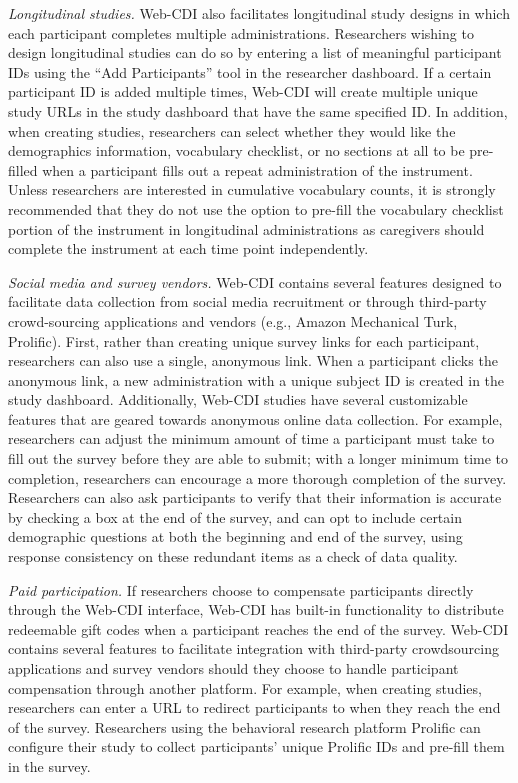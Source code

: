 \documentclass[
  english,
  ,man,floatsintext]{apa6}
\begin{document}
\emph{Longitudinal studies.} Web-CDI also facilitates longitudinal study designs in which each participant completes multiple administrations. Researchers wishing to design longitudinal studies can do so by entering a list of meaningful participant IDs using the \enquote{Add Participants} tool in the researcher dashboard. If a certain participant ID is added multiple times, Web-CDI will create multiple unique study URLs in the study dashboard that have the same specified ID. In addition, when creating studies, researchers can select whether they would like the demographics information, vocabulary checklist, or no sections at all to be pre-filled when a participant fills out a repeat administration of the instrument. Unless researchers are interested in cumulative vocabulary counts, it is strongly recommended that they do not use the option to pre-fill the vocabulary checklist portion of the instrument in longitudinal administrations as caregivers should complete the instrument at each time point independently.

\emph{Social media and survey vendors.} Web-CDI contains several features designed to facilitate data collection from social media recruitment or through third-party crowd-sourcing applications and vendors (e.g., Amazon Mechanical Turk, Prolific). First, rather than creating unique survey links for each participant, researchers can also use a single, anonymous link. When a participant clicks the anonymous link, a new administration with a unique subject ID is created in the study dashboard. Additionally, Web-CDI studies have several customizable features that are geared towards anonymous online data collection. For example, researchers can adjust the minimum amount of time a participant must take to fill out the survey before they are able to submit; with a longer minimum time to completion, researchers can encourage a more thorough completion of the survey. Researchers can also ask participants to verify that their information is accurate by checking a box at the end of the survey, and can opt to include certain demographic questions at both the beginning and end of the survey, using response consistency on these redundant items as a check of data quality.

\emph{Paid participation.} If researchers choose to compensate participants directly through the Web-CDI interface, Web-CDI has built-in functionality to distribute redeemable gift codes when a participant reaches the end of the survey. Web-CDI contains several features to facilitate integration with third-party crowdsourcing applications and survey vendors should they choose to handle participant compensation through another platform. For example, when creating studies, researchers can enter a URL to redirect participants to when they reach the end of the survey. Researchers using the behavioral research platform Prolific can configure their study to collect participants' unique Prolific IDs and pre-fill them in the survey.
\end{document}
